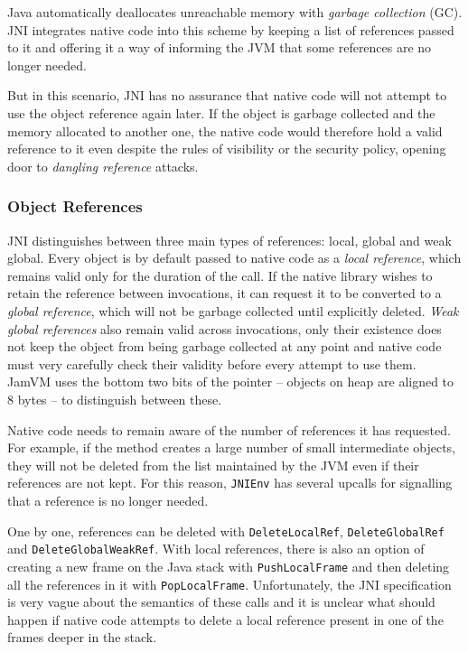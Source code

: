 \documentclass[a4paper,12pt,twoside,openright]{report}
\begin{document}
Java automatically deallocates unreachable memory with \emph{garbage collection} (GC). JNI integrates native code into this scheme by keeping a list of references passed to it and offering it a way of informing the JVM that some references are no longer needed. 

But in this scenario, JNI has no assurance that native code will not attempt to use the object reference again later. If the object is garbage collected and the memory allocated to another one, the native code would therefore hold a valid reference to it even despite the rules of visibility or the security policy, opening door to \emph{dangling reference} attacks.

\subsubsection{Object References}
\label{sec:LocalAndGlobalRefs}

JNI distinguishes between three main types of references: local, global and weak global. Every object is by default passed to native code as a \emph{local reference}, which remains valid only for the duration of the call. If the native library wishes to retain the reference between invocations, it can request it to be converted to a \emph{global reference}, which will not be garbage collected until explicitly deleted. \emph{Weak global references} also remain valid across invocations, only their existence does not keep the object from being garbage collected at any point and native code must very carefully check their validity before every attempt to use them. JamVM uses the bottom two bits of the pointer -- objects on heap are aligned to 8 bytes -- to distinguish between these.

Native code needs to remain aware of the number of references it has requested. For example, if the method creates a large number of small intermediate objects, they will not be deleted from the list maintained by the JVM even if their references are not kept. For this reason, \texttt{JNIEnv} has several upcalls for signalling that a reference is no longer needed. 

One by one, references can be deleted with \texttt{DeleteLocalRef}, \texttt{DeleteGlobalRef} and \texttt{DeleteGlobalWeakRef}. With local references, there is also an option of creating a new frame on the Java stack with \texttt{PushLocalFrame} and then deleting all the references in it with \texttt{PopLocalFrame}. Unfortunately, the JNI specification is very vague about the semantics of these calls and it is unclear what should happen if native code attempts to delete a local reference present in one of the frames deeper in the stack.
\end{document}
